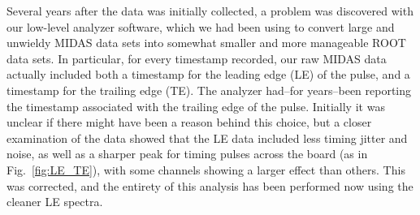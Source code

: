 
Several years after the data was initially collected, a problem was discovered with our low-level analyzer software, which we had been using to convert large and unwieldy MIDAS data sets into somewhat smaller and more manageable ROOT data sets.  In particular, for every timestamp recorded, our raw MIDAS data actually included both a timestamp for the leading edge (LE) of the pulse, and a timestamp for the trailing edge (TE).  The analyzer had--for years--been reporting the timestamp associated with the trailing edge of the pulse.  Initially it was unclear if there might have been a reason behind this choice, but a closer examination of the data showed that the LE data included less timing jitter and noise, as well as a sharper peak for timing pulses across the board (as in Fig.~\ref{fig:LE_TE}), with some channels showing a larger effect than others.  This was corrected, and the entirety of this analysis has been performed now using the cleaner LE spectra.  



